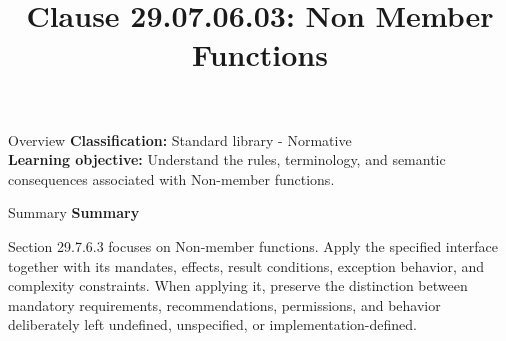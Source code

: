 \documentclass[10pt,letterpaper]{article}
\title{Clause 29.07.06.03: Non Member Functions}
\author{}
\date{}
\begin{document}
\maketitle
\begin{CornellOverviewBox}{Overview}
\textbf{Classification:} Standard library - Normative\\[2pt]
\textbf{Learning objective:} Understand the rules, terminology, and semantic consequences associated with Non-member functions.
\end{CornellOverviewBox}\begin{CornellSummaryBox}{Summary}
{\sffamily\bfseries\color{Accent} Summary}\par\vspace{3pt}Section 29.7.6.3 focuses on Non-member functions. Apply the specified interface together with its mandates, effects, result conditions, exception behavior, and complexity constraints. When applying it, preserve the distinction between mandatory requirements, recommendations, permissions, and behavior deliberately left undefined, unspecified, or implementation-defined.
\end{CornellSummaryBox}
\end{document}
